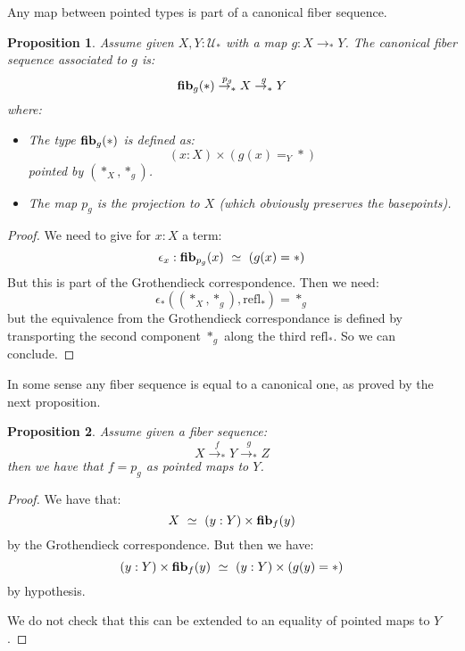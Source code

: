 \documentclass{article}
\newcommand{\U}{{\mathcal U}}
\renewcommand{\r}{\rightarrow}
\newcommand{\refl}{\mathrm{refl}}
\newcommand{\fib}{\mathrm{\bf fib}}
\newtheorem{proposition}{Proposition}
\begin{document}
Any map between pointed types is part of a canonical fiber sequence.

\begin{proposition}
Assume given $X,Y:\U_*$ with a map $g:X\r_* Y$. The canonical fiber sequence associated to $g$ is:
\[\fib_g(*) \overset{p_g}{\r_*} X \overset{g}{\r_*} Y\]
where:
\begin{itemize}
\item The type $\fib_g(*)$ is defined as:
\[(x:X)\times (g(x)=_Y*)\] 
pointed by $(*_X,*_g)$.
\item The map $p_g$ is the projection to $X$ (which obviously preserves the basepoints).
\end{itemize}
\end{proposition}
\begin{proof}
We need to give for $x:X$ a term: 
\[\epsilon_x : \fib_{p_g}(x)\ \simeq\ (g(x)=*)\]
But this is part of the Grothendieck correspondence. Then we need: 
\[\epsilon_*((*_X,*_g),\refl_{*}) = *_g\]
but the equivalence from the Grothendieck correspondance is defined by transporting the second component $*_g$ along the third $\refl_{*}$. So we can conclude.
\end{proof}

In some sense any fiber sequence is equal to a canonical one, as proved by the next proposition.

\begin{proposition}
Assume given a fiber sequence:
\[X \overset{f}{\r_*} Y\overset{g}{\r_*} Z\]
then we have that $f=p_g$ as pointed maps to $Y$. 
\end{proposition}
\begin{proof}
We have that: 
\[X\ \simeq\ (y:Y)\times \fib_f(y)\]
by the Grothendieck correspondence. But then we have:
 \[(y:Y)\times \fib_f(y) \ \simeq\ (y:Y)\times (g(y)=*)\]
 by hypothesis.
 
We do not check that this can be extended to an equality of pointed maps to $Y$.
\end{proof}
\end{document}
